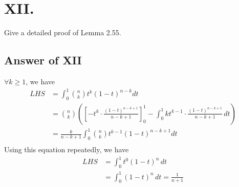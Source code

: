 \documentclass[a4paper]{article}
\begin{document}
\section*{XII.}
Give a detailed proof of Lemma 2.55.

\subsection*{Answer of XII}
$\forall k \geq 1$, we have
\begin{align*}
  LHS&=\int_{0}^{1}\binom{n}{k}t^{k}(1-t)^{n-k}dt\\
  &=\binom{n}{k}(\left[ -t^k \cdot \frac{(1-t)^{n-k+1}}{n-k+1} \right]_0^1-\int_0^1 k t^{k-1} \cdot \frac{(1-t)^{n-k+1}}{n-k+1} \,dt)\\
  &=\frac{k}{n-k+1}\int_0^1 \binom{n}{k}t^{k-1}(1-t)^{n-k+1}dt\\
\end{align*}
Using this equation repeatedly, we have
\begin{align*}
LHS&=\int_0^1 t^0 (1-t)^n \, dt \\
&= \int_0^1 (1-t)^n \, dt = \frac{1}{n+1}
\end{align*}
\end{document}
